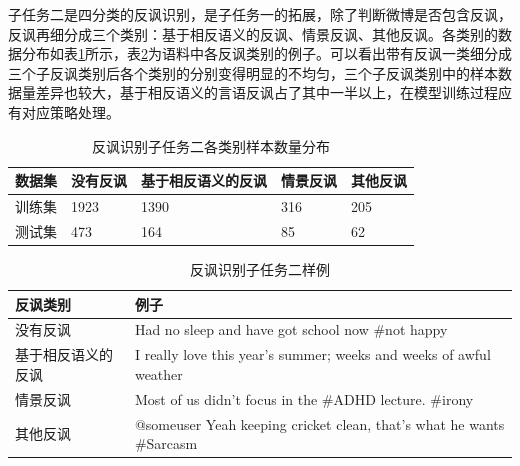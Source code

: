 子任务二是四分类的反讽识别，是子任务一的拓展，除了判断微博是否包含反讽，反讽再细分成三个类别：基于相反语义的反讽、情景反讽、其他反讽。各类别的数据分布如表\ref{tab:semeval_2018_task3_B_data}所示，表\ref{tab:semeval_2018_task3_B_sample}为语料中各反讽类别的例子。可以看出带有反讽一类细分成三个子反讽类别后各个类别的分别变得明显的不均匀，三个子反讽类别中的样本数据量差异也较大，基于相反语义的言语反讽占了其中一半以上，在模型训练过程应有对应策略处理。

\begin{table}[htb]
  \centering
  \begin{minipage}[t]{\linewidth} %
  \caption{反讽识别子任务二各类别样本数量分布}
  \label{tab:semeval_2018_task3_B_data}
    \begin{tabularx}{\linewidth}{X|XXXX}
    \toprule[1.5pt]
    数据集 & 没有反讽 & 基于相反语义的反讽 & 情景反讽 & 其他反讽\\  
    \hline
    训练集 & 1923 & 1390 & 316  & 205 \\
    测试集 & 473  & 164  & 85  & 62 \\
    \bottomrule[1.5pt]
    \end{tabularx}
  \end{minipage}
\end{table}

\begin{table}[htb]
  \centering
  \begin{minipage}[t]{\linewidth} %
  \caption{反讽识别子任务二样例}
  \label{tab:semeval_2018_task3_B_sample}
  \begin{tabularx}{\linewidth}{l|X}
    \toprule[1.5pt]
    \small 反讽类别 & 例子 \\
    \hline
    \small 没有反讽 & Had no sleep and have got school now \#not happy \\
    \small 基于相反语义的反讽 & \small I really love this year’s summer; weeks and weeks of awful weather \\
    \small 情景反讽 & Most of us didn’t focus in the \#ADHD lecture. \#irony \\
    \small 其他反讽 & @someuser Yeah keeping cricket clean, that's what he wants \#Sarcasm \\
    \bottomrule[1.5pt]
  \end{tabularx}
  \end{minipage}
\end{table}

